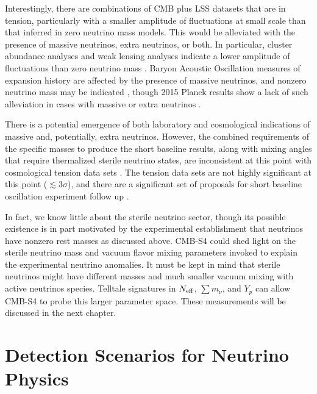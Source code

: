 Interestingly, there are combinations of CMB plus LSS
datasets that are in tension, particularly with a smaller amplitude of
fluctuations at small scale than that inferred in zero neutrino mass
models. This would be alleviated with the
presence of massive neutrinos, extra neutrinos, or both. In particular,
cluster abundance analyses \cite{Wyman:2013lza,Ade:2015fva} and weak lensing analyses
\cite{Battye:2013xqa} indicate a lower amplitude of
fluctuations than zero neutrino mass \cite{Giusarma:2014zza}. Baryon Acoustic
Oscillation measures of expansion history are affected by the presence
of massive neutrinos, and nonzero neutrino mass may be indicated 
\cite{Beutler:2014yhv}, though 2015 Planck results show a lack of such
alleviation in cases with massive or extra neutrinos
\cite{Ade:2015xua}. 

There is a potential emergence of both laboratory and cosmological
indications of massive and, potentially, extra neutrinos. However, the
combined requirements of the specific masses to produce the short
baseline results, along with mixing angles that require thermalized
sterile neutrino states, are inconsistent at this point with
cosmological tension data sets
\cite{Joudaki:2012uk,Archidiacono:2013xxa}. The tension data sets are
not highly significant at this point ($\lesssim 3\sigma$), and there
are a significant set of proposals for short baseline oscillation
experiment follow up \cite{Abazajian:2012ys}. 


In fact, we know little about the sterile neutrino sector, though its possible existence is in part motivated by the experimental establishment that neutrinos have nonzero rest masses as discussed above. CMB-S4 could shed light on the sterile neutrino mass and vacuum flavor mixing parameters invoked to explain the experimental neutrino anomalies. It must be kept in mind that sterile neutrinos might have different masses and much smaller vacuum mixing with active neutrinos species. Telltale signatures in $N_{\rm eff}$, $\sum m_{\nu}$, and $Y_p$ can allow CMB-S4 to probe this larger parameter space.  These measurements will be discussed in the next chapter.



\section{Detection Scenarios for Neutrino Physics} \label{sec:neuscenarios}

